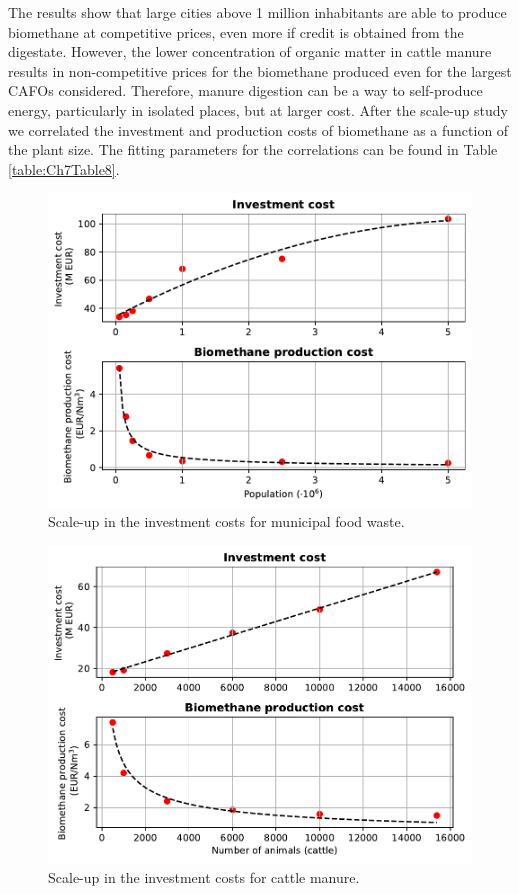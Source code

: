 \begin{refsection}[referencesCh7]
The results show that large cities above 1 million inhabitants are able to produce biomethane at competitive prices, even more if credit is obtained from the digestate. However, the lower concentration of organic matter in cattle manure results in non-competitive prices for the biomethane produced even for the largest CAFOs considered. Therefore, manure digestion can be a way to self-produce energy, particularly in isolated places, but at larger cost. After the scale-up study we correlated the investment and production costs of biomethane as a function of the plant size. The fitting parameters for the correlations can be found in Table \ref{table:Ch7Table8}.

\begin{figure}[h]
	\centering
	\includegraphics[width=0.9\linewidth, trim={0cm 0cm 0cm 0cm},clip]{gfx/Chapter7/Figure5.pdf} 
	\caption{Scale-up in the investment costs for municipal food waste.}
	\label{fig:Ch7Fig5}
\end{figure}

\begin{figure}[h]
	\centering
	\includegraphics[width=0.9\linewidth, trim={0cm 0cm 0cm 0cm},clip]{gfx/Chapter7/Figure6.pdf} 
	\caption{Scale-up in the investment costs for cattle manure.}
	\label{fig:Ch7Fig6}
\end{figure}


\end{refsection}
